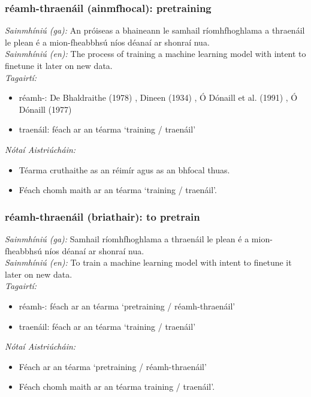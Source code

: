 \subsubsection*{réamh-thraenáil (ainmfhocal): pretraining}
 \noindent \textit{Sainmhíniú (ga):} An próiseas a bhaineann le samhail ríomhfhoghlama a thraenáil le plean é a mion-fheabbhsú níos déanaí ar shonraí nua.
\\
 \noindent \textit{Sainmhíniú (en):} The process of training a machine learning model with intent to finetune it later on new data.
\\
 \noindent \textit{Tagairtí:}
\begin{itemize}
	\item réamh-: De Bhaldraithe (1978) \cite{de-bhaldraithe}, Dineen (1934) \cite{dineen}, Ó Dónaill et al. (1991) \cite{focloir-beag}, Ó Dónaill (1977) \cite{odonaill}
	\item traenáil: féach ar an téarma `training / traenáil'
\end{itemize}

 \noindent \textit{Nótaí Aistriúcháin:}
\begin{itemize}
	\item Téarma cruthaithe as an réimír agus as an bhfocal thuas.
	\item Féach chomh maith ar an téarma `training / traenáil'.
\end{itemize}


\subsubsection*{réamh-thraenáil (briathair): to pretrain}
 \noindent \textit{Sainmhíniú (ga):} Samhail ríomhfhoghlama a thraenáil le plean é a mion-fheabbhsú níos déanaí ar shonraí nua.
\\
 \noindent \textit{Sainmhíniú (en):} To train a machine learning model with intent to finetune it later on new data.
\\
 \noindent \textit{Tagairtí:}
\begin{itemize}
	\item réamh-: féach ar an téarma `pretraining / réamh-thraenáil'
	\item traenáil: féach ar an téarma `training / traenáil'
\end{itemize}

 \noindent \textit{Nótaí Aistriúcháin:}
\begin{itemize}
	\item Féach ar an téarma `pretraining / réamh-thraenáil'
	\item Féach chomh maith ar an téarma training / traenáil'.
\end{itemize}


